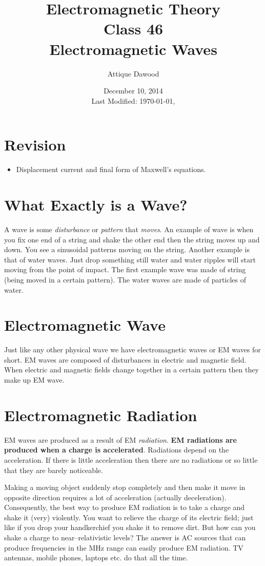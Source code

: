 \documentclass[12pt,a4paper]{article}
\title{Electromagnetic Theory\\Class 46\\Electromagnetic Waves}
\author{Attique Dawood}
\date{December 10, 2014\\[0.2cm] Last Modified: \today, \currenttime}
\begin{document}
\maketitle
\section{Revision}
\begin{itemize}
\item Displacement current and final form of Maxwell's equations.
\end{itemize}
\section{What Exactly is a Wave?}
A wave is some \textit{disturbance} or \textit{pattern} that \textit{moves}. An example of wave is when you fix one end of a string and shake the other end then the string moves up and down. You see a sinusoidal patterns moving on the string. Another example is that of water waves. Just drop something still water and water ripples will start moving from the point of impact. The first example wave was made of string (being moved in a certain pattern). The water waves are made of particles of water.
\section{Electromagnetic Wave}
Just like any other physical wave we have electromagnetic waves or EM waves for short. EM waves are composed of disturbances in electric and magnetic field. When electric and magnetic fields change together in a certain pattern then they make up EM wave.
\section{Electromagnetic Radiation}
EM waves are produced as a result of EM \textit{radiation}. \textbf{EM radiations are produced when a charge is accelerated}. Radiations depend on the acceleration. If there is little acceleration then there are no radiations or so little that they are barely noticeable.

Making a moving object suddenly stop completely and then make it move in opposite direction requires a lot of acceleration (actually deceleration). Consequently, the best way to produce EM radiation is to take a charge and shake it (very) violently. You want to relieve the charge of its electric field; just like if you drop your handkerchief you shake it to remove dirt. But how can you shake a charge to near--relativistic levels? The answer is AC sources that can produce frequencies in the MHz range can easily produce EM radiation. TV antennas, mobile phones, laptops etc. do that all the time.
\end{document}
